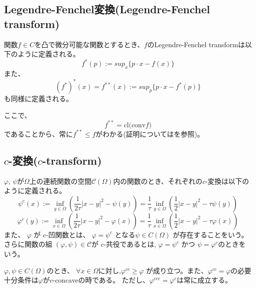 \subsection{Legendre-Fenchel変換(Legendre-Fenchel transform)}
\label{sect:Legendre-Fenchel変換(Legendre-Fenchel transform)}
\begin{dfn}
    関数$f \in C$を凸で微分可能な関数とするとき、$f$のLegendre-Fenchel transformは以下のように定義される。
    \begin{equation}
        f^*(p) := sup_x\{p \cdot x - f(x) \} 
    \end{equation}
    また、
    \begin{equation}
        (f^*)^*(x) = f^{**} (x) := sup_p\{p \cdot x - f^*(p) \}
    \end{equation}
    も同様に定義される。
\end{dfn}
ここで、
\[
    f^{**} = \text{cl(conv} f)  
\]
であることから、常に$f^{**} \le f$がわかる(証明については\cite[Thm. 11.1(p474)]{MR1491362}を参照)。

\subsection{$c$-変換($c$-transform)}
\label{sect:c-変換(c-transform)}
\begin{dfn}
    $\varphi$, $\psi$が$\Omega$上の連続関数の空間$\mathcal{C}(\Omega)$内の関数のとき、それぞれの$c$-変換は以下のように定義される。
    \begin{equation}
        \label{dfn:backward-c-transform}
        \psi^c(x) := \inf_{y \in \Omega} \left( \frac{1}{2\tau}|x-y|^2 - \psi(y)\right) = \frac{1}{\tau}\inf_{y \in \Omega} \left( \frac{1}{2}|x-y|^2 - \tau\psi(y)\right)
    \end{equation}
    \begin{equation}
        \label{dfn:forward-c-transform}
        \varphi^c(y) := \inf_{x \in \Omega} \left( \frac{1}{2\tau}|x-y|^2 - \varphi(x)\right) = \frac{1}{\tau}\inf_{x \in \Omega} \left( \frac{1}{2}|x-y|^2 - \tau\varphi(x)\right)
    \end{equation}
    また、 $\varphi$ が $c$-凹関数とは、 $\varphi = \psi^c$ となる$\psi \in C(\Omega)$ が存在することをいう。
    さらに関数の組 $(\varphi, \psi) \in \mathcal{C}$が $c$-共役であるとは, $\varphi = \psi^c$ かつ $\psi = \varphi^c$のときをいう。
\end{dfn}


\begin{lem}
    \label{lem:c-transform}
    $\varphi, \psi \in C(\Omega)$のとき、
    $\forall x \in \Omega \text{に対し,}\varphi^{cc} \ge \varphi$
    が成り立つ。また、$\varphi^{cc} = \varphi$の必要十分条件は$\varphi$が$c$-concaveの時である。
    ただし、$\varphi^{ccc} = \varphi^c$は常に成立する\cite[(Lemma 1(i))]{MR4169482}。
\end{lem}


